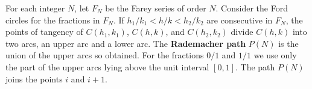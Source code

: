 For each integer $N$, let $F_N$ be the Farey series of order $N$. Consider the Ford circles for the fractions in $F_N$. If $h_1/k_1 < h/k < h_2/k_2$ are consecutive in $F_N$, the points of tangency of $C(h_1, k_1)$, $C(h, k)$, and $C(h_2, k_2)$ divide $C(h, k)$ into two arcs, an upper arc and a lower arc. The \textbf{Rademacher path} $P(N)$ is the union of the upper arcs so obtained. For the fractions $0/1$ and $1/1$ we use only the part of the upper arcs lying above the unit interval $[0, 1]$. The path $P(N)$ joins the points $i$ and $i+1$.
